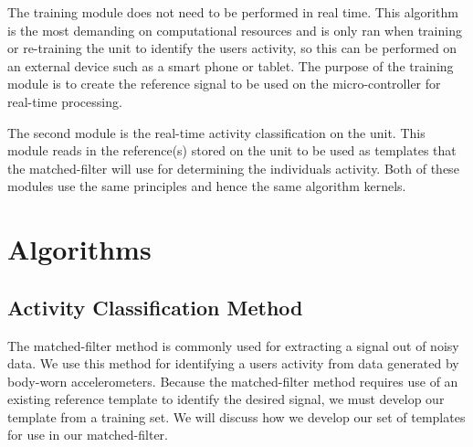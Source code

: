 \documentclass[journal]{IEEEtran}
\begin{document}
The training module does not need to be performed in real time.
This algorithm is the most demanding on computational resources and is only ran when training or re-training the unit to identify the user\textquotesingle s activity, so this can be performed on an external device such as a smart phone or tablet.
The purpose of the training module is to create the reference signal to be used on the micro-controller for real-time processing.

The second module is the real-time activity classification on the unit.
This module reads in the reference(s) stored on the unit to be used as templates that the matched-filter will use for determining the individual\textquotesingle s activity.
Both of these modules use the same principles and hence the same algorithm kernels.
%
\section{Algorithms}
\subsection{Activity Classification Method}
The matched-filter method is commonly used for extracting a signal out of noisy data.
We use this method for identifying a user\textquotesingle s activity from data generated by body-worn accelerometers.
Because the matched-filter method requires use of an existing reference template to identify the desired signal, we must develop our template from a training set.
We will discuss how we develop our set of templates for use in our matched-filter.
\end{document}
